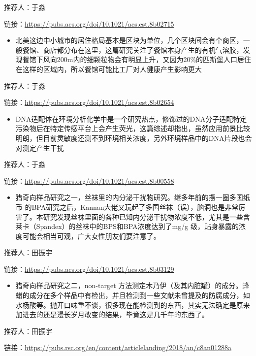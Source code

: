 \documentclass[
]{book}
\providecommand{\tightlist}{%
  \setlength{\itemsep}{0pt}\setlength{\parskip}{0pt}}
\begin{document}
推荐人：于淼

链接：\url{https://pubs.acs.org/doi/10.1021/acs.est.8b02715}

\begin{itemize}
\tightlist
\item
  北美这边中小城市的居住格局基本是区块为单位，几个区块间会有个商区，一般餐馆、商店都分布在这里，这篇研究关注了餐馆本身产生的有机气溶胶，发现餐馆下风向200m内的细颗粒物会有明显上升，又因为20\%的匹斯堡人口居住在这样的区域内，所以餐馆可能比工厂对人健康产生影响更大
\end{itemize}

推荐人：于淼

链接：\url{https://pubs.acs.org/doi/10.1021/acs.est.8b02654}

\begin{itemize}
\tightlist
\item
  DNA适配体在环境分析化学中是一个研究热点，修饰过的DNA分子适配特定污染物后在特定传感平台上会产生荧光，这篇综述却指出，虽然应用前景比较明朗，但目前灵敏度还测不到环境相关浓度，另外环境样品中的DNA片段也会对测定产生干扰
\end{itemize}

推荐人：于淼

链接：\url{https://pubs.acs.org/doi/10.1021/acs.est.8b00558}

\begin{itemize}
\tightlist
\item
  猎奇向样品研究之一，丝袜里的内分泌干扰物研究。继多年前的摆一圈多国纸币 的BPA研究之后，Kannan大佬又玩起了多国丝袜（误），脑洞也是非常厉害了。本研究发现丝袜里面的各种已知内分泌干扰物浓度不低，尤其是一些含莱卡（Spandex）的丝袜中的BPS和BPA浓度达到了mg/g 级，贴身暴露的浓度可能会相当可观，广大女性朋友们要注意了。
\end{itemize}

推荐人：田振宇

链接：\url{https://pubs.acs.org/doi/10.1021/acs.est.8b03129}

\begin{itemize}
\tightlist
\item
  猎奇向样品研究之二，non-target 方法测定木乃伊（及其内脏罐）的成分。蜂蜡的成分在多个样品中有检出，并且检测到一些文献未曾提及的防腐成分，如水杨酸等。抛开口味重不谈，很多现在能检测到的东西，其实无法确定是原来加进去的还是漫长岁月改变的结果，毕竟这是几千年的东西了。
\end{itemize}

推荐人：田振宇

链接：\url{https://pubs.rsc.org/en/content/articlelanding/2018/an/c8an01288a}
\end{document}
